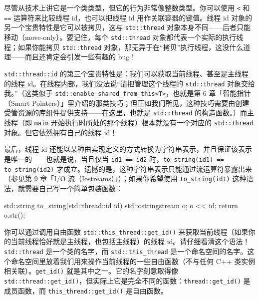 尽管从技术上讲它是一个类类型，但它的行为非常像整数类型。你可以使用 \texttt{<} 和 \texttt{==} 运算符来比较线程 id，也可以把线程 id 用作关联容器的键值。线程 id 对象的另一个宝贵特性是它可以被拷贝，这与 \texttt{std::\allowbreak{}thread} 对象本身不同——后者只能移动（move-only）。要记住，每个 \texttt{std::\allowbreak{}thread} 对象都代表一个实际的执行线程；如果你能拷贝 \texttt{std::\allowbreak{}thread} 对象，那无异于在“拷贝”执行线程，这没什么道理——而且还肯定会引发一些有趣的 bug！

\texttt{std::\allowbreak{}thread::\allowbreak{}id} 的第三个宝贵特性是：我们可以获取当前线程、甚至是主线程的线程 id。在线程内部，我们没法说“请把管理这个线程的 \texttt{std::\allowbreak{}thread} 对象交给我。”（这类似于 \texttt{std::\allowbreak{}enable\_\allowbreak{}shared\_\allowbreak{}from\_\allowbreak{}this<\allowbreak{}T>\allowbreak{}}，也就是第 6 章「智能指针（Smart Pointers）」里介绍的那类技巧；但正如我们所见，这种技巧需要由创建受管资源的库组件提供支持——在这里，也就是 \texttt{std::\allowbreak{}thread} 的构造函数。）而主线程（即 \texttt{main} 开始执行时所处的那个线程）根本就没有一个对应的 \texttt{std::\allowbreak{}thread} 对象。但它依然拥有自己的线程 id！

最后，线程 id 还能以某种由实现定义的方式转换为字符串表示，并且保证该表示是唯一的——也就是说，当且仅当 \texttt{id1 == id2} 时，\texttt{to\_\allowbreak{}string(\allowbreak{}id1)\allowbreak{} == to\_\allowbreak{}string(\allowbreak{}id2)\allowbreak{}} 才成立。遗憾的是，这种字符串表示只能通过流运算符暴露出来（参见第 9 章「I/O 流（Iostreams）」）；如果你希望使用 \texttt{to\_\allowbreak{}string(\allowbreak{}id1)\allowbreak{}} 这种语法，就需要自己写一个简单包装函数：

\begin{codebox}[cpp]
    std::string to_string(std::thread::id id)
    {
      std::ostringstream o;
      o << id;
      return o.str();
    }
\end{codebox}

你可以通过调用自由函数 \texttt{std::\allowbreak{}this\_\allowbreak{}thread::\allowbreak{}get\_\allowbreak{}id(\allowbreak{})\allowbreak{}} 来获取当前线程（如果你的当前线程恰好就是主线程，也包括主线程）的线程 id。请仔细看清这个语法！\texttt{std::\allowbreak{}thread} 是一个类的名字，而 \texttt{std::\allowbreak{}this\_\allowbreak{}thread} 是一个命名空间的名字。这个命名空间里放着我们用来操作当前线程的一些自由函数（不与任何 C++ 类实例相关联）。\texttt{get\_\allowbreak{}id(\allowbreak{})\allowbreak{}} 就是其中之一。它的名字刻意取得像 \texttt{std::\allowbreak{}thread::\allowbreak{}get\_\allowbreak{}id(\allowbreak{})\allowbreak{}}，但实际上它是完全不同的函数：\texttt{thread::\allowbreak{}get\_\allowbreak{}id(\allowbreak{})\allowbreak{}} 是成员函数，而 \texttt{this\_\allowbreak{}thread::\allowbreak{}get\_\allowbreak{}id(\allowbreak{})\allowbreak{}} 是自由函数。


